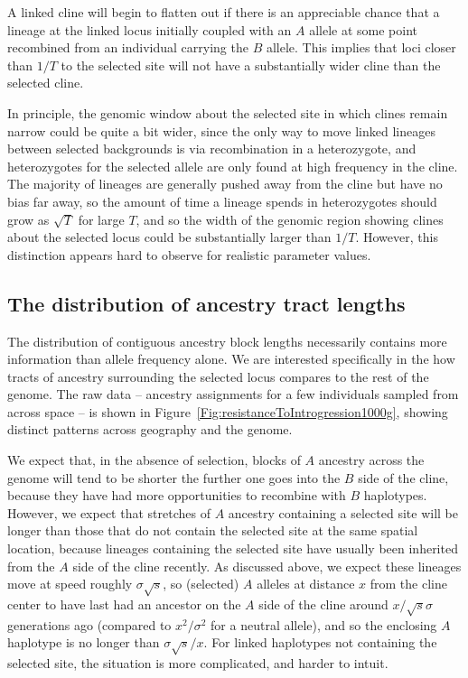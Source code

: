 \documentclass[11pt,letterpaper]{article}
\newcommand{\plr}[1]{{\em \color{blue} #1}}
\begin{document}
A linked cline will begin to flatten out if there is an appreciable chance that a lineage at the linked locus initially coupled with an $A$ allele 
at some point recombined from an individual carrying the $B$ allele.
This implies that loci closer than $1/T$ to the selected site will not have a substantially wider cline than the selected cline.

In principle, the genomic window about the selected site
in which clines remain narrow could be quite a bit wider,
since the only way to move linked lineages between selected backgrounds is via recombination in a heterozygote,
and heterozygotes for the selected allele are only found at high frequency in the cline.
The majority of lineages are generally pushed away from the cline but have no bias far away,
so the amount of time a lineage spends in heterozygotes should grow as $\sqrt{T}$ for large $T$,
and so the width of the genomic region showing clines about the selected locus could be 
substantially larger than $1/T$. However, this distinction appears hard to observe for realistic parameter values.






\subsection*{The distribution of ancestry tract lengths}

The distribution of contiguous ancestry block lengths necessarily contains more information than allele frequency alone. We are interested specifically in the how tracts of ancestry surrounding the selected locus compares to the rest of the genome. 
The raw data -- ancestry assignments for a few individuals sampled from across space --
is shown in Figure~\ref{Fig:resistanceToIntrogression1000g},
showing distinct patterns across geography and the genome.

We expect that, in the absence of selection, blocks of $A$ ancestry across the genome 
will tend to be shorter the further one goes into the $B$ side of the cline,
because they have had more opportunities to recombine with $B$ haplotypes. 
However, we expect that stretches of $A$ ancestry containing a selected site will be longer
than those that do not contain the selected site at the same spatial location,
because lineages containing the selected site have usually been inherited from the $A$ side of the cline recently. 
As discussed above, we expect these lineages move at speed roughly $\sigma\sqrt{s}$,
so (selected) $A$ alleles at distance $x$ from the cline center
to have last had an ancestor on the $A$ side of the cline around $x /\sqrt{s}\sigma$ generations ago 
(compared to $x^2/\sigma^2$ for a neutral allele),
and so the enclosing $A$ haplotype is no longer than $\sigma\sqrt{s}/x $.
For linked haplotypes not containing the selected site, the situation is more complicated, and harder to intuit.
\end{document}

